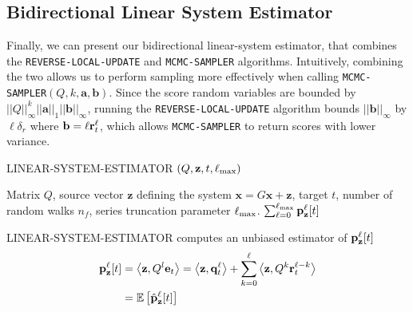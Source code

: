 \subsection{Bidirectional Linear System Estimator}

Finally, we can present our bidirectional linear-system estimator, that combines the \texttt{REVERSE-LOCAL-UPDATE} and \texttt{MCMC-SAMPLER} algorithms. Intuitively, combining the two allows us to perform sampling more effectively when calling \texttt{MCMC-SAMPLER}$(Q, k, \mathbf{a}, \mathbf{b})$. Since the score random variables are bounded by $||Q||_{\infty}^k||\mathbf{a}||_1||\mathbf{b}||_{\infty}$, running the \texttt{REVERSE-LOCAL-UPDATE} algorithm bounds $||\mathbf{b}||_{\infty}$ by $\ell \delta_r$ where $\mathbf{b} = \ell\mathbf{r}^{\ell}_t$, which allows \texttt{MCMC-SAMPLER} to return scores with lower variance.
\begin{algorithm}[ht]
\caption{LINEAR-SYSTEM-ESTIMATOR $(Q, \mathbf{z}, t,\ell_{\max})$}
\label{alg:linearsysest}
\begin{algorithmic}[1]
\REQUIRE Matrix $Q$, source vector $\mathbf{z}$ defining the system $\mathbf{x} = G \mathbf{x} + \mathbf{z}$, target $t$, number of random walks $n_f$, series truncation parameter $\ell_{\max}$.
\ENDFOR
{}
\ENDFOR
\RETURN $\sum_{\ell=0}^{\ell_{\max}} {\mathbf{p}}_\mathbf{z}^{\ell}[t]$ 
\end{algorithmic}
\end{algorithm} 

\begin{lemma}
LINEAR-SYSTEM-ESTIMATOR computes an unbiased estimator of ${\mathbf{p}}_\mathbf{z}^{\ell}[t]$
\begin{align*}
{\mathbf{p}}_\mathbf{z}^{\ell}[t] &=  \left<\mathbf{z}, Q^l \mathbf{e}_t \right>= \left<\mathbf{z}, \mathbf{q}_t^{\ell} \right> + \sum_{k=0}^{\ell} \left<\mathbf{z} , Q^k\mathbf{r}_t^{\ell-k}\right>\\
&= \mathbb{E}\left[\hat{\mathbf{p}}_\mathbf{z}^{\ell}[t] \right]
\end{align*}
\end{lemma}

